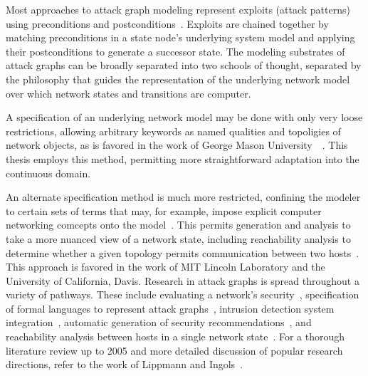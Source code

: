 Most approaches to attack graph modeling represent exploits (attack patterns) using
preconditions and postconditions~\cite{lippmann2005annotated, 
templeton2001requires}. Exploits are chained together by matching preconditions
in a state node's underlying system model and applying their postconditions to 
generate a successor state.
The modeling substrates of attack graphs can be broadly separated into two schools of
thought, separated by the philosophy that guides the representation of the underlying
network model over which network states and transitions are computer.

A specification of an underlying network model may be done with only very loose
restrictions, allowing arbitrary keywords as named qualities and topoligies of 
network objects, as is favored in the work of George Mason 
University~\cite{ammann2002scalable}~\cite{wang2006minimum}.
This thesis employs this method, permitting more straightforward adaptation 
into the continuous domain.

An alternate specification method is much more restricted, confining the modeler to
certain sets of terms that may, for example, impose explicit computer networking 
comcepts onto the model~\cite{templeton2001requires}.
This permits generation and analysis to take a
more nuanced view of a network state, including reachability analysis to determine whether a
given topology permits communication between two hosts~\cite{ingols2009modeling}. This approach
is favored in the work of MIT Lincoln Laboratory and the University of California, Davis.
Research in attack graphs is spread throughout a variety of pathways. These include
evaluating a network's security~\cite{ammann2002scalable}, specification of formal languages
to represent attack graphs~\cite{templeton2001requires}, intrusion detection system 
integration~\cite{tidwell2001modeling}, automatic generation of security recommendations~\cite{wang2006minimum},
and reachability analysis between hosts in a single network state~\cite{ingols2009modeling}. 
For a thorough literature review up to 2005 and more detailed discussion of popular research directions, 
refer to the work of Lippmann and Ingols~\cite{lippmann2005annotated}.

